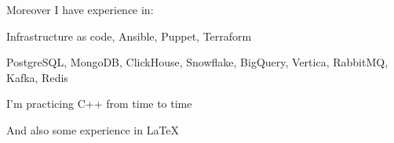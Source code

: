 Moreover I have experience in:
\begin{bulist}
  \item Infrastructure as code, Ansible, Puppet, Terraform
  \item PostgreSQL, MongoDB, ClickHouse, Snowflake, BigQuery, Vertica,
    RabbitMQ, Kafka, Redis
  \item I'm practicing C++ from time to time
\end{bulist}
And also some experience in \LaTeX

